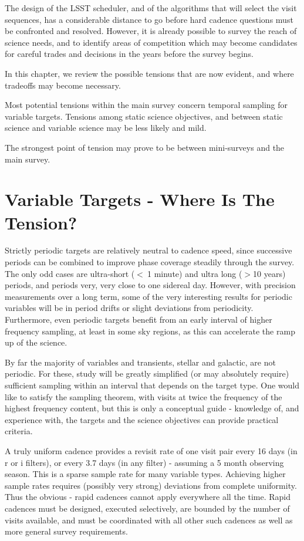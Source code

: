 The design of the LSST scheduler, and of the algorithms that will select
the visit sequences, has a considerable distance to go before hard
cadence questions must be confronted and resolved.  However, it is
already possible to survey the reach of science needs, and to identify
areas of competition which may become candidates for careful trades and
decisions in the years before the survey begins.

In this chapter, we review the possible tensions that are now evident,
and where tradeoffs may become necessary.

Most potential tensions within the main survey concern temporal sampling
for variable targets.  Tensions among static science objectives, and
between static science and variable science may be less likely and mild.

The strongest point of tension may prove to be between mini-surveys and
the main survey.



\section{Variable Targets - Where Is The Tension?}

Strictly periodic targets are relatively neutral to cadence speed, since
successive periods can be combined to improve phase coverage steadily
through the survey.  The only odd cases are ultra-short ($<~ $1 minute)
and ultra long ($> $10 years) periods, and periods very, very close to
one sidereal day.  However, with precision measurements over a long
term, some of the very interesting results for periodic variables will
be in period drifts or slight deviations from periodicity. Furthermore,
even periodic targets benefit from an early interval of higher frequency
sampling, at least in some sky regions, as this can accelerate the ramp
up of the science.

By far the majority of variables and transients, stellar and galactic,
are not periodic. For these, study will be greatly simplified (or may
absolutely require) sufficient sampling within an interval that depends
on the target type. One would like to satisfy the sampling theorem, with
visits at twice the frequency of the highest frequency content, but this
is only a conceptual guide - knowledge of, and experience with, the
targets and the science objectives can provide practical criteria.

A truly uniform cadence provides a revisit rate of one visit pair every
16 days (in r or i filters), or every 3.7 days (in any filter) -
assuming a 5 month observing season.  This is a sparse sample rate for
many variable types.  Achieving higher sample rates requires (possibly
very strong) deviations from complete uniformity.  Thus the obvious -
rapid cadences cannot apply everywhere all the time. Rapid cadences must
be designed, executed selectively, are bounded by the number of visits
available, and must be coordinated with all other such cadences as well
as more general survey requirements.

